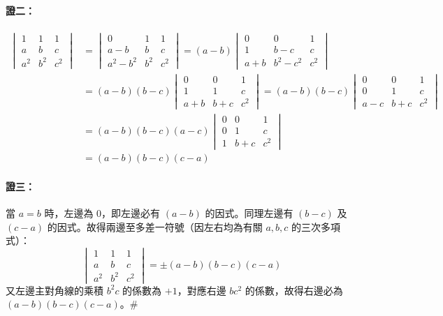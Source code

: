 \paragraph{證二：}
\begin{align*}
\begin{vmatrix}
1 & 1 & 1 \\
a & b & c \\
a^2 & b^2 & c^2
\end{vmatrix}
&= \begin{vmatrix}
0 & 1 & 1 \\
a-b & b & c \\
a^2-b^2 & b^2 & c^2
\end{vmatrix} = (a-b) \begin{vmatrix}
0 & 0 & 1 \\
1 & b-c & c \\
a+b & b^2-c^2 & c^2
\end{vmatrix} \\
&= (a-b)(b-c) \begin{vmatrix}
0 & 0 & 1 \\
1 & 1 & c \\
a+b & b+c & c^2
\end{vmatrix} = (a-b)(b-c) \begin{vmatrix}
0 & 0 & 1 \\
0 & 1 & c \\
a-c & b+c & c^2
\end{vmatrix} \\
&= (a-b)(b-c)(a-c) \begin{vmatrix}
0 & 0 & 1 \\
0 & 1 & c \\
1 & b+c & c^2
\end{vmatrix} \\
&= (a-b)(b-c)(c-a)
\end{align*}

\paragraph{證三：}當 $a=b$ 時，左邊為 0，即左邊必有 $(a-b)$ 的因式。同理左邊有 $(b-c)$ 及 $(c-a)$ 的因式。故得兩邊至多差一符號（因左右均為有關 $a, b, c$ 的三次多項式）：
\[ \begin{vmatrix}
1 & 1 & 1 \\
a & b & c \\
a^2 & b^2 & c^2
\end{vmatrix} = \pm (a-b)(b-c)(c-a) \]
又左邊主對角線的乘積 $b^2c$ 的係數為 $+1$，對應右邊 $bc^2$ 的係數，故得右邊必為 $(a-b)(b-c)(c-a)$。\hfill$\#$

